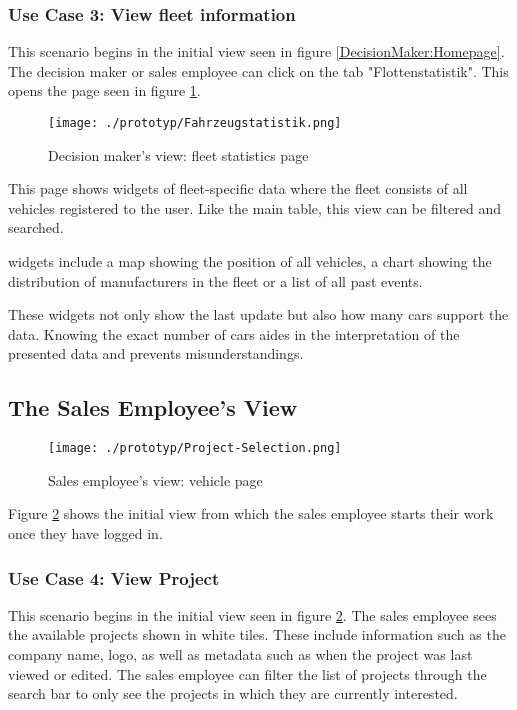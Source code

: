 \subsubsection{Use Case 3: View fleet information}

This scenario begins in the initial view seen in figure \ref{DecisionMaker:Homepage}. The decision maker or sales employee can click on the tab "Flottenstatistik". This opens the page seen in figure \ref{DecisionMaker:Fahrzeugstatistik}.
\begin{figure}[H]
  \centering
  \texttt{[image: ./prototyp/Fahrzeugstatistik.png]}
  \caption{Decision maker's view: fleet statistics page}
  \label{DecisionMaker:Fahrzeugstatistik}
\end{figure}

This page shows \glspl{widget} of fleet-specific data where the fleet consists of all vehicles registered to the user. Like the main table, this view can be filtered and searched.

\Glspl{widget} include a map showing the position of all vehicles, a chart showing the distribution of manufacturers in the fleet or a list of all past events.

These \glspl{widget} not only show the last update but also how many cars support the \gls{data}. Knowing the exact number of cars aides in the interpretation of the presented data and prevents misunderstandings.

\newpage

\subsection{The Sales Employee's View}

\begin{figure}[ht]
  \centering
  \texttt{[image: ./prototyp/Project-Selection.png]}
  \caption{Sales employee's view: vehicle page}
  \label{Configurator:ProjectSelection}
\end{figure}

Figure \ref{Configurator:ProjectSelection} shows the initial view from which the sales employee starts their work once they have logged in.


\subsubsection{Use Case 4: View Project}

This scenario begins in the initial view seen in figure \ref{Configurator:ProjectSelection}. The sales employee sees the available projects shown in white tiles. These include information such as the company name, logo, as well as metadata such as when the project was last viewed or edited. The sales employee can filter the list of projects through the search bar to only see the projects in which they are currently interested.


